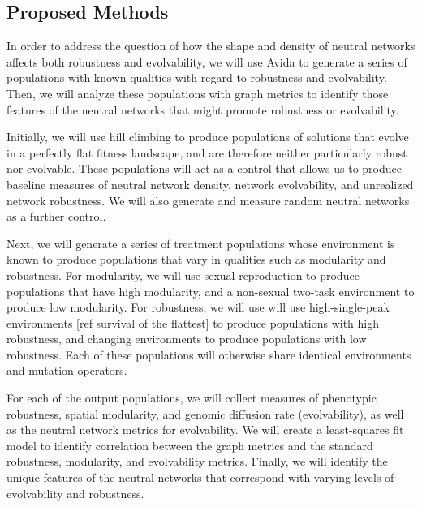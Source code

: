 \subsection{Proposed Methods}

In order to address the question of how the shape and density of neutral networks affects both robustness and evolvability, we will use Avida to generate a series of populations with known qualities with regard to robustness and evolvability. Then, we will analyze these populations with graph metrics to identify those features of the neutral networks that might promote robustness or evolvability.

Initially, we will use hill climbing to produce populations of solutions that evolve in a perfectly flat fitness landscape, and are therefore neither particularly robust nor evolvable. These populations will act as a control that allows us to produce baseline measures of neutral network density, network evolvability, and unrealized network robustness. We will also generate and measure random neutral networks as a further control. 

Next, we will generate a series of treatment populations whose environment is known to produce populations that vary in qualities such as modularity and robustness. For modularity, we will use sexual reproduction to produce populations that have high modularity, and a non-sexual two-task environment to produce low modularity. For robustness, we will use will use high-single-peak environments [ref survival of the flattest] to produce populations with high robustness, and changing environments to produce populations with low robustness. Each of these populations will otherwise share identical environments and mutation operators.

For each of the output populations, we will collect measures of phenotypic robustness, spatial modularity, and genomic diffusion rate (evolvability), as well as the neutral network metrics for evolvability. We will create a least-squares fit model to identify correlation between the graph metrics and the standard robustness, modularity, and evolvability metrics. Finally, we will identify the unique features of the neutral networks that correspond with varying levels of evolvability and robustness. 